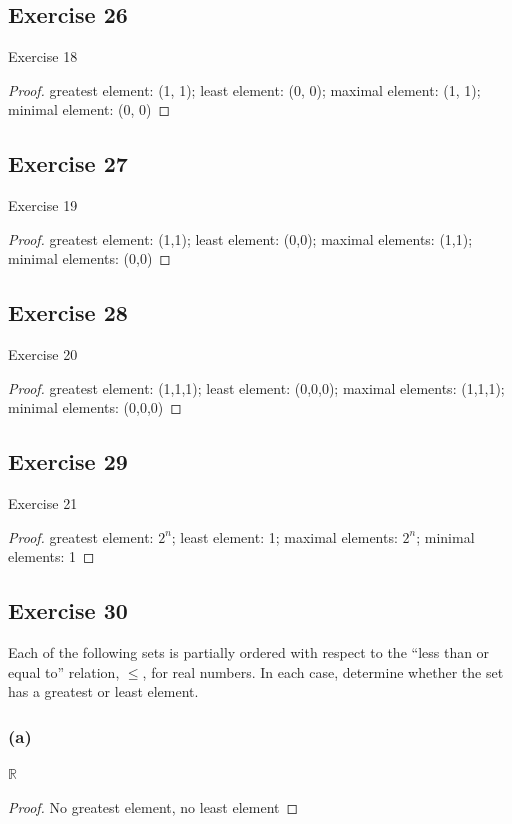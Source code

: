 \documentclass[14pt]{extarticle}
\newcommand{\R}{\mathbb{R}}
\begin{document}
\subsection{Exercise 26}
Exercise 18
\begin{proof}
greatest element: (1, 1); least element: (0, 0); maximal element: (1, 1); minimal element: (0, 0)
\end{proof}

\subsection{Exercise 27}
Exercise 19
\begin{proof}
greatest element: (1,1); least element: (0,0); maximal elements: (1,1); minimal elements: (0,0)
\end{proof}

\subsection{Exercise 28}
Exercise 20
\begin{proof}
greatest element: (1,1,1); least element: (0,0,0); maximal elements: (1,1,1); minimal elements: (0,0,0)
\end{proof}

\subsection{Exercise 29}
Exercise 21
\begin{proof}
greatest element: \(2^n\); least element: 1; maximal elements: \(2^n\); minimal elements: 1
\end{proof}

\subsection{Exercise 30}
Each of the following sets is partially ordered with respect to the “less than or equal to” relation, \(\leq\), 
for real numbers. In each case, determine whether the set has a greatest or least element.

\subsubsection{(a)}
\(\R\)
\begin{proof}
No greatest element, no least element

\end{proof}
\end{document}

